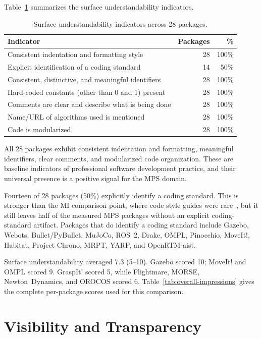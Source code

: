 Table~\ref{tab:understandability-summary} summarizes the surface understandability indicators.

\begin{table}[H]
\centering
\caption{Surface understandability indicators across 28 packages.}
\label{tab:understandability-summary}
\begin{tabular}{@{}lrr@{}}
\toprule
\textbf{Indicator} & \textbf{Packages} & \textbf{\%} \\
\midrule
Consistent indentation and formatting style & 28 & 100\% \\
Explicit identification of a coding standard & 14 & 50\% \\
Consistent, distinctive, and meaningful identifiers & 28 & 100\% \\
Hard-coded constants (other than 0 and 1) present & 28 & 100\% \\
Comments are clear and describe what is being done & 28 & 100\% \\
Name/URL of algorithms used is mentioned & 28 & 100\% \\
Code is modularized & 28 & 100\% \\
\bottomrule
\end{tabular}
\end{table}

All 28 packages exhibit consistent indentation and formatting, meaningful identifiers, clear comments, and modularized code organization. These are baseline indicators of professional software development practice, and their universal presence is a positive signal for the MPS domain.

Fourteen of 28 packages (50\%) explicitly identify a coding standard. This is stronger than the MI comparison point, where code style guides were rare~\citep{Smith2024MI}, but it still leaves half of the measured MPS packages without an explicit coding-standard artifact. Packages that do identify a coding standard include Gazebo, Webots, Bullet/PyBullet, MuJoCo, ROS~2, Drake, OMPL, Pinocchio, MoveIt!, Habitat, Project Chrono, MRPT, YARP, and OpenRTM-aist.

Surface understandability averaged 7.3 (5--10). Gazebo scored 10; MoveIt! and OMPL scored 9. GraspIt! scored 5, while Flightmare, MORSE, Newton~Dynamics, and OROCOS scored 6. Table~\ref{tab:overall-impressions} gives the complete per-package scores used for this comparison.

\section{Visibility and Transparency}
\label{sec:visibility-transparency-results}

